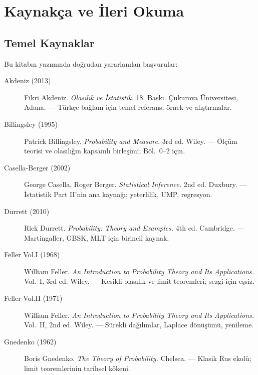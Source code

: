 \chapter{Kaynakça ve İleri Okuma}
\label{app:kaynaklar}

\section{Temel Kaynaklar}

Bu kitabın yazımında doğrudan yararlanılan başvurular:

\begin{description}
  \item[Akdeniz (2013)] Fikri Akdeniz. \textit{Olasılık ve İstatistik.} 18. Baskı. Çukurova Üniversitesi, Adana. --- Türkçe bağlam için temel referans; örnek ve alıştırmalar.

  \item[Billingsley (1995)] Patrick Billingsley. \textit{Probability and Measure.} 3rd ed. Wiley. --- Ölçüm teorisi ve olasılığın kapsamlı birleşimi; Böl.~0--2 için.

  \item[Casella-Berger (2002)] George Casella, Roger Berger. \textit{Statistical Inference.} 2nd ed. Duxbury. --- İstatistik Part II'nin ana kaynağı; yeterlilik, UMP, regresyon.

  \item[Durrett (2010)] Rick Durrett. \textit{Probability: Theory and Examples.} 4th ed. Cambridge. --- Martingaller, GBSK, MLT için birincil kaynak.

  \item[Feller Vol.I (1968)] William Feller. \textit{An Introduction to Probability Theory and Its Applications.} Vol.~I, 3rd ed. Wiley. --- Kesikli olasılık ve limit teoremleri; sezgi için eşsiz.

  \item[Feller Vol.II (1971)] William Feller. \textit{An Introduction to Probability Theory and Its Applications.} Vol.~II, 2nd ed. Wiley. --- Sürekli dağılımlar, Laplace dönüşümü, yenileme.

  \item[Gnedenko (1962)] Boris Gnedenko. \textit{The Theory of Probability.} Chelsea. --- Klasik Rus ekolü; limit teoremlerinin tarihsel kökeni.


\end{description}
